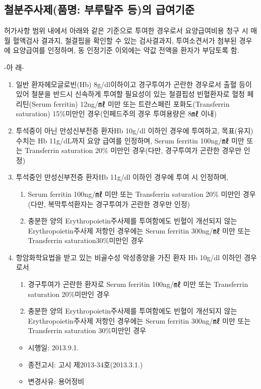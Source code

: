 \subsection{철분주사제(품명: 부루탈주 등)의 급여기준}
허가사항 범위 내에서 아래와 같은 기준으로 투여한 경우로서 요양급여비용 청구 시 매월 혈액검사 결과지, 철결핍을 확인할 수 있는 검사결과지, 투여소견서가 첨부된 경우에 요양급여를 인정하며, 동 인정기준 이외에는 약값 전액을 환자가 부담토록 함.\par
-아 래-
\begin{enumerate}[가)]\tightlist
\item 일반 환자헤모글로빈(Hb) 8g/dl이하이고 경구투여가 곤란한 경우로서 출혈 등이 있어 철분을 반드시 신속하게 투여할 필요성이 있는 철결핍성 빈혈환자로 혈청 페리틴(Serum ferritin) 12ng/㎖ 미만 또는 트란스페린 포화도(Transferrin saturation) 15\%미만인 경우(인페드주의 경우 투여용량은 8㎖ 이내) 
\item 투석중이 아닌 만성신부전증 환자Hb 10g/dl 이하인 경우에 투여하고, 목표(유지) 수치는 Hb 11g/dL까지 요양 급여를 인정하며, Serum ferritin 100ng/㎖ 미만 또는 Transferrin saturation 20\% 미만인 경우(다만, 경구투여가 곤란한 경우만 인정) 
\item 투석중인 만성신부전증 환자Hb 11g/dl 이하인 경우에 투여 시 인정하며,
	\begin{enumerate}[1)]\tightlist
	\item Serum ferritin 100ng/㎖ 미만 또는 Transferrin saturation 20\% 미만인 경우(다만, 복막투석환자는 경구투여가 곤란한 경우만 인정)
	\item 충분한 양의 Erythropoietin주사제를 투여함에도 빈혈이 개선되지 않는 Erythropoietin주사제 저항인 경우에는 Serum ferritin 300ng/㎖ 미만 또는 Transferrin saturation30\%미만인 경우
	\end{enumerate}
\item 항암화학요법을 받고 있는 비골수성 악성종양을 가진 환자 Hb 10g/dl 이하인 경우로서 
	\begin{enumerate}\tightlist
	\item 경구투여가 곤란한 환자로 Serum ferritin 100ng/㎖ 미만 또는 Transferrin saturation 20\%미만인 경우
	\item 충분한 양의 Erythropoietin주사제를 투여함에도 빈혈이 개선되지 않는 Erythropoietin주사제 저항인 경우에는 Serum ferritin 300ng/㎖ 미만 또는 Transferrin saturation 30\%미만인 경우
  	\end{enumerate}
	\begin{itemize}[*]\tightlist
	\item 시행일: 2013.9.1.
	\item 종전고시: 고시 제2013-34호(2013.3.1.)
	\item 변경사유: 용어정비
	\end{itemize}
\end{enumerate}
